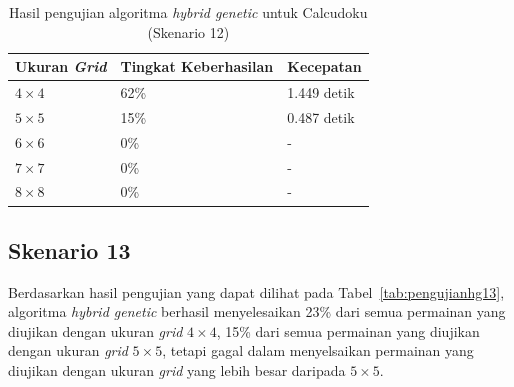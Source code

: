 \begin{table}
\centering
\captionsetup{justification=centering}
\caption[Hasil pengujian algoritma \textit{hybrid genetic} untuk Calcudoku (Skenario 12)]{Hasil pengujian algoritma \textit{hybrid genetic} untuk Calcudoku (Skenario 12)}
\begin{tabular}{| l | l | l |}
\hline
Ukuran \textit{Grid} & Tingkat Keberhasilan & Kecepatan \\
\hline \hline
\begin{math}4 \times 4\end{math} & 62\% & 1.449 detik \\
\hline
\begin{math}5 \times 5\end{math} & 15\% & 0.487 detik \\
\hline
\begin{math}6 \times 6\end{math} & 0\% & - \\
\hline
\begin{math}7 \times 7\end{math} & 0\% & - \\
\hline
\begin{math}8 \times 8\end{math} & 0\% & - \\
\hline
\end{tabular}
\label{tab:pengujianhg12}
\end{table}

\subsection{Skenario 13}
\label{sec:skenario13}

Berdasarkan hasil pengujian yang dapat dilihat pada Tabel~\ref{tab:pengujianhg13}, algoritma \textit{hybrid genetic} berhasil menyelesaikan 23\% dari semua permainan yang diujikan dengan ukuran \textit{grid} \begin{math}4 \times 4\end{math}, 15\% dari semua permainan yang diujikan dengan ukuran \textit{grid} \begin{math}5 \times 5\end{math}, tetapi gagal dalam menyelsaikan permainan yang diujikan dengan ukuran \textit{grid} yang lebih besar daripada \begin{math}5 \times 5\end{math}.

